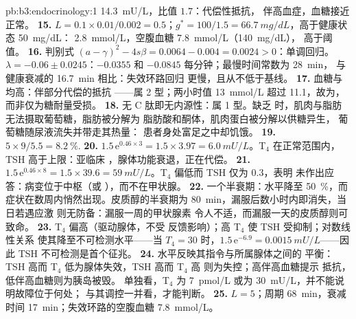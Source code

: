\begin{solution}{pb:b3:endocrinology:1}
\qty{14.3}{mU/L}，比值 $1.7$：代偿性抵抗，
伴高血症，血糖接近正常。
\textbf{15.} $L = 0.1\times 0.01/0.002 = 0.5$；$g^{*} = 100/1.5 =
\qty{66.7}{mg/dL}$，高于健康状态 \qty{50}{mg/dL}：
\qty{2.8}{mmol/L}，空腹血糖 \qty{7.8}{mmol/L}（\qty{140}{mg/dL}），
高于阈值。
\textbf{16.} 判别式 $(a - \gamma)^{2} - 4s\beta = 0.0064 - 0.004 =
0.0024 > 0$：单调回归。$\lambda = -0.06 \pm 0.0245$：$-0.0355$
和 $-0.0845$ 每分钟；最慢时间常数为 \qty{28}{min}，
与健康衰减的 \qty{16.7}{min} 相比：失效环路回归
更慢，且从不低于基线。
\textbf{17.} 血糖与均高：伴部分代偿的抵抗
——属 2 型；两小时值 \qty{13}{mmol/L} 超过
\qty{11.1}{}，故为，而非仅为糖耐量受损。
\textbf{18.} 无 C 肽即无内源性：属 1 型。缺乏
时，肌肉与脂肪无法摄取葡萄糖，脂肪被分解为
脂肪酸和酮体，肌肉蛋白被分解以供糖异生，
葡萄糖随尿液流失并带走其热量：
患者身处富足之中却饥饿。
\textbf{19.} $5\times 9/5.5 = \qty{8.2}{\%}$.
\textbf{20.} $1.5\,\mathrm{e}^{0.46\times 3} = 1.5\times 3.97 =
\qty{6.0}{mU/L}$。T$_{4}$ 在正常范围内，TSH 高于上限：亚临床
，腺体功能衰退，正在代偿。
\textbf{21.} $1.5\,\mathrm{e}^{0.46\times 8} = 1.5\times 39.6 =
\qty{59}{mU/L}$。T$_{4}$ 偏低而 TSH 仅为 $0.3$，表明
未作出应答：病变位于中枢（或
），而不在甲状腺。
\textbf{22.} 一个半衰期：水平降至 \qty{50}{\%}，而
症状在数周内悄然出现。皮质醇的半衰期为
\qty{80}{min}，漏服后数小时内即消失，当日若遇应激
则无防备：漏服一周的甲状腺素
令人不适，而漏服一天的皮质醇则可致命。
\textbf{23.} T$_{4}$ 偏高（驱动腺体，不受
反馈影响）；高 T$_{4}$ 使 TSH 受抑制；对数线性关系
使其降至不可检测水平——当 $T_{4} = 30$ 时，$1.5\,\mathrm{e}^{-6.9}
= \qty{0.0015}{mU/L}$——因此 TSH 不可检测是首个征兆。
\textbf{24.} 水平反映其指令与所属腺体之间的
平衡：TSH 高而 T$_{4}$ 低为腺体失效，TSH 高而 T$_{4}$ 高
则为失控；高伴高血糖提示
抵抗，低伴高血糖则为胰岛被毁。
单独看，T$_{4}$ 为 \qty{7}{pmol/L} 或为
\qty{30}{mU/L}，并不能说明故障位于何处；
与其调控一并看，才能判断。
\textbf{25.}  $L = 5$；周期 \qty{68}{min}，衰减时间
\qty{17}{min}；失效环路的空腹血糖 \qty{7.8}{mmol/L}。
\end{solution}
